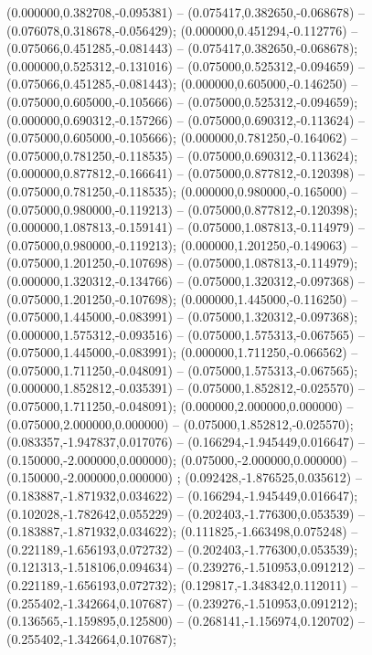  (0.000000,0.382708,-0.095381) -- (0.075417,0.382650,-0.068678) -- (0.076078,0.318678,-0.056429);
 (0.000000,0.451294,-0.112776) -- (0.075066,0.451285,-0.081443) -- (0.075417,0.382650,-0.068678);
 (0.000000,0.525312,-0.131016) -- (0.075000,0.525312,-0.094659) -- (0.075066,0.451285,-0.081443);
 (0.000000,0.605000,-0.146250) -- (0.075000,0.605000,-0.105666) -- (0.075000,0.525312,-0.094659);
 (0.000000,0.690312,-0.157266) -- (0.075000,0.690312,-0.113624) -- (0.075000,0.605000,-0.105666);
 (0.000000,0.781250,-0.164062) -- (0.075000,0.781250,-0.118535) -- (0.075000,0.690312,-0.113624);
 (0.000000,0.877812,-0.166641) -- (0.075000,0.877812,-0.120398) -- (0.075000,0.781250,-0.118535);
 (0.000000,0.980000,-0.165000) -- (0.075000,0.980000,-0.119213) -- (0.075000,0.877812,-0.120398);
 (0.000000,1.087813,-0.159141) -- (0.075000,1.087813,-0.114979) -- (0.075000,0.980000,-0.119213);
 (0.000000,1.201250,-0.149063) -- (0.075000,1.201250,-0.107698) -- (0.075000,1.087813,-0.114979);
 (0.000000,1.320312,-0.134766) -- (0.075000,1.320312,-0.097368) -- (0.075000,1.201250,-0.107698);
 (0.000000,1.445000,-0.116250) -- (0.075000,1.445000,-0.083991) -- (0.075000,1.320312,-0.097368);
 (0.000000,1.575312,-0.093516) -- (0.075000,1.575313,-0.067565) -- (0.075000,1.445000,-0.083991);
 (0.000000,1.711250,-0.066562) -- (0.075000,1.711250,-0.048091) -- (0.075000,1.575313,-0.067565);
 (0.000000,1.852812,-0.035391) -- (0.075000,1.852812,-0.025570) -- (0.075000,1.711250,-0.048091);
 (0.000000,2.000000,0.000000) -- (0.075000,2.000000,0.000000) -- (0.075000,1.852812,-0.025570);
 (0.083357,-1.947837,0.017076) -- (0.166294,-1.945449,0.016647) -- (0.150000,-2.000000,0.000000);
 (0.075000,-2.000000,0.000000) -- (0.150000,-2.000000,0.000000) ;
 (0.092428,-1.876525,0.035612) -- (0.183887,-1.871932,0.034622) -- (0.166294,-1.945449,0.016647);
 (0.102028,-1.782642,0.055229) -- (0.202403,-1.776300,0.053539) -- (0.183887,-1.871932,0.034622);
 (0.111825,-1.663498,0.075248) -- (0.221189,-1.656193,0.072732) -- (0.202403,-1.776300,0.053539);
 (0.121313,-1.518106,0.094634) -- (0.239276,-1.510953,0.091212) -- (0.221189,-1.656193,0.072732);
 (0.129817,-1.348342,0.112011) -- (0.255402,-1.342664,0.107687) -- (0.239276,-1.510953,0.091212);
 (0.136565,-1.159895,0.125800) -- (0.268141,-1.156974,0.120702) -- (0.255402,-1.342664,0.107687);
